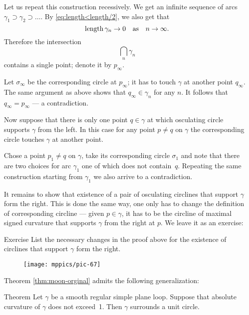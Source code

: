 Let us repeat this construction recessively.
We get an infinite sequence of arcs $\gamma_1\supset \gamma_2\supset\dots$.
By \ref{eq:length<length/2}, we also get that 
\[\mathop{\rm length}\nolimits\gamma_n\to0\quad\text{as}\quad n\to\infty.\] 
Therefore the intersection 
\[\bigcap_n\gamma_n\]
contains a single point; denote it by $p_\infty$.

Let $\sigma_\infty$ be the corresponding circle at $p_\infty$; it has to touch $\gamma$ at another point $q_\infty$.
The same argument as above shows that $q_\infty\in\gamma_n$ for any $n$.
It follows that $q_\infty =p_\infty$ --- a contradiction.

Now suppose that there is only one point $q\in\gamma$ at which osculating circle supports $\gamma$ from the left.
In this case for any point $p\ne q$ on $\gamma$ the corresponding circle touches $\gamma$ at another point.

Chose a point $p_1\ne q$ on $\gamma$, take its corresponding circle $\sigma_1$ and note that there are two choices for arc $\gamma_1$ one of which does not contain~$q$.
Repeating the same construction starting from $\gamma_1$ we also arrive to a contradiction.

It remains to show that existence of a pair of osculating circlines that support $\gamma$ form the right.
This is done the same way, one only has to change the definition of corresponding circline --- given $p\in\gamma$, it has to be the circline of maximal signed curvature that supports $\gamma$ from the right at $p$.
We leave it as an exercise:

\begin{thm}{Exercise}\label{ex:finish-moon}
List the necessary changes in the proof above for the existence of circlines that support $\gamma$ form the right.\qeds
\end{thm}

{

\begin{wrapfigure}{r}{12 mm}
\vskip-4mm
\centering
\texttt{[image: mppics/pic-67]}
\vskip0mm
\end{wrapfigure}

Theorem \ref{thm:moon-orginal} admits the following generalization:

\begin{thm}{Theorem}\label{thm:moon-gen}
Let $\gamma$ be a smooth regular simple plane loop.
Suppose that absolute curvature of $\gamma$ does not exceed~1.
Then $\gamma$ surrounds a unit circle.
\end{thm}

}


